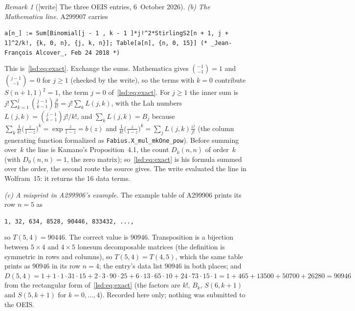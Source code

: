 \documentclass[11pt]{article}
\theoremstyle{remark}\newtheorem{remark}{Remark}
\newcommand{\file}[1]{\nolinkurl{#1}}
\begin{document}
\begin{remark}[{[write]} The three OEIS entries, 6~October 2026]
\emph{(b) The Mathematica line.} A299907 carries
\begin{center}\small
\parbox{0.92\textwidth}{\raggedright\texttt{a[n\_] := Sum[Binomial[j - 1 , k - 1 ]*j!\textasciicircum2*StirlingS2[n + 1, j + 1]\textasciicircum2/k!, \{k, 0, n\}, \{j, k, n\}]; Table[a[n], \{n, 0, 15\}] (* \_Jean-Fran\c{c}ois Alcover\_, Feb 24 2018 *)}}
\end{center}
This is~\eqref{lsd:eq:exact}. Exchange the sums. Mathematica gives
$\binom{-1}{-1}=1$ and $\binom{j-1}{-1}=0$ for $j\ge1$ (checked by the write),
so the terms with $k=0$ contribute $S(n+1,1)^2=1$, the term $j=0$
of~\eqref{lsd:eq:exact}. For $j\ge1$ the inner sum is
$j!\sum_{k=1}^{j}\binom{j-1}{k-1}\frac{j!}{k!}=j!\sum_kL(j,k)$, with the Lah
numbers $L(j,k)=\binom{j-1}{k-1}j!/k!$, and $\sum_kL(j,k)=B_j$ because
$\sum_k\frac1{k!}\bigl(\frac z{1-z}\bigr)^k=\exp\frac z{1-z}=b(z)$ and
$\frac1{k!}\bigl(\frac z{1-z}\bigr)^k=\sum_jL(j,k)\frac{z^j}{j!}$ (the
column generating function formalized as \file{Fabius.X_mul_mkOne_pow}). Before
summing over~$k$ the line is Kamano's Proposition~4.1, the count $D_k(n,n)$ of
order~$k$ (with $D_0(n,n)=1$, the zero matrix); so~\eqref{lsd:eq:exact} is
his formula summed over the order, the second route the source gives. The
write evaluated the line in Wolfram~15: it returns the 16 data terms.

\emph{(c) A misprint in A299906's example.} The example table of A299906
prints its row $n=5$ as
\begin{center}\small
\texttt{1, 32, 634, 8528, 90446, 833432, ...,}
\end{center}
so $T(5,4)=90446$. The correct value is $90946$. Transposition is a bijection
between $5\times4$ and $4\times5$ lonesum decomposable matrices (the
definition is symmetric in rows and columns), so $T(5,4)=T(4,5)$, which the
same table prints as $90946$ in its row $n=4$; the entry's data list $90946$
in both places; and
$D(5,4)=1+1\cdot1\cdot31\cdot15+2\cdot3\cdot90\cdot25+6\cdot13\cdot65\cdot10
+24\cdot73\cdot15\cdot1=1+465+13500+50700+26280=90946$ from the rectangular
form of~\eqref{lsd:eq:exact} (the factors are $k!$, $B_k$, $S(6,k+1)$ and
$S(5,k+1)$ for $k=0,\dots,4$). Recorded here only; nothing was submitted to
the OEIS.
\end{remark}
\end{document}
